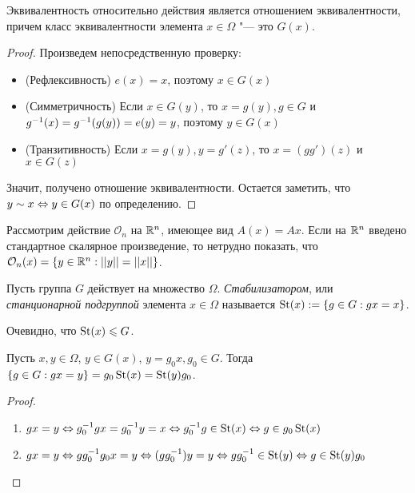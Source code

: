 \begin{proposition}
	Эквивалентность относительно действия является отношением эквивалентности, причем класс эквивалентности элемента $x \in \Omega$ "--- это $G(x)$.
\end{proposition}

\begin{proof} Произведем непосредственную проверку:
	\begin{itemize}
		\item (Рефлексивность) $e(x) = x$, поэтому $x \in G(x)$
		\item (Симметричность) Если $x \in G(y)$, то $x = g(y), g \in G$ и $g^{-1}(x) \hm= g^{-1}(g(y)) = e(y) = y$, поэтому $y \in G(x)$
		\item (Транзитивность) Если $x = g(y), y = g'(z)$, то $x = (gg')(z)$ и $x \in G(z)$
	\end{itemize}
	
	Значит, получено отношение эквивалентности. Остается заметить, что $y \sim x \Leftrightarrow y \hm\in G(x)$ по определению.
\end{proof}

\begin{example}
	Рассмотрим действие $\mathcal{O}_n$ на $\mathbb{R}^n$, имеющее вид $A(x) = Ax$. Если на $\mathbb{R}^n$ введено стандартное скалярное произведение, то нетрудно показать, что $\mathcal{O}_n(x) = \{y \in \R^n: ||y|| \hm= ||x||\}$.
\end{example}

\begin{definition}
	Пусть группа $G$ действует на множество $\Omega$. \textit{Стабилизатором}, или \textit{станционарной подгруппой} элемента $x \in \Omega$ называется $\operatorname{St}(x) := \{g \in G: gx = x\}$.
\end{definition}

\begin{note}
	Очевидно, что $\operatorname{St}(x) \leqslant G$.
\end{note}

\begin{proposition}
	Пусть $x, y \in \Omega$, $y \in G(x)$, $y = g_0x, g_0 \in G$. Тогда $\{g \in G: gx = y\} \hm= g_0\St(x) = \St(y)g_0$.
\end{proposition}

\begin{proof}~
	\begin{enumerate}
		\item $gx = y \Leftrightarrow g^{-1}_0gx = g^{-1}_0y = x \Leftrightarrow g_0^{-1}g \in \St(x) \hm\Leftrightarrow g \in g_0\St(x)$
		\item $gx \hm= y \Leftrightarrow gg_0^{-1}g_0x = y \Leftrightarrow (gg_0^{-1})y = y \Leftrightarrow gg_0^{-1} \in \St(y) \Leftrightarrow g \hm\in \St(y)g_0$
	\end{enumerate}
\end{proof}

